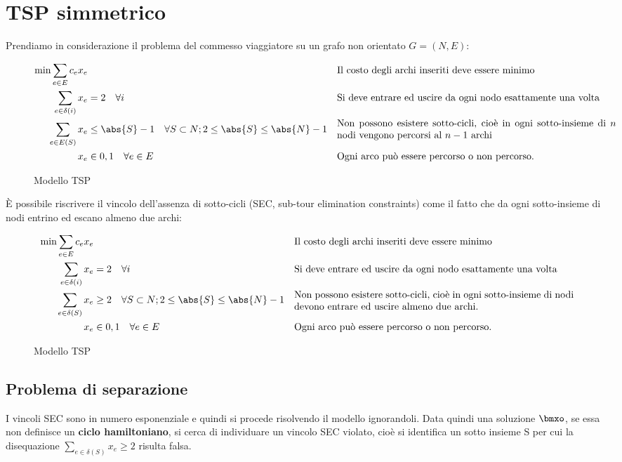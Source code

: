\documentclass[\main/main.tex]{subfiles}
\begin{document}
\chapter{TSP simmetrico}
Prendiamo in considerazione il problema del commesso viaggiatore su un grafo non orientato \(G=(N,E)\):
\begin{figure}
    \begin{align*}
        \min \sum_{e\in E} c_e x_e & &&\text{Il costo degli archi inseriti deve essere minimo}\\
        \sum_{e \in \delta(i)} x_e &= 2\quad \forall i &&\text{Si deve entrare ed uscire da ogni nodo esattamente una volta}\\
        \sum_{e \in E(S)} x_e & \leq \abs{S} - 1 \quad \forall S \subset N; 2 \leq \abs{S} \leq \abs{N} -1 && \parbox{10cm}{Non possono esistere sotto-cicli, cioè in ogni sotto-insieme di \(n\) nodi vengono percorsi al \(n-1\) archi}\\
        x_e & \in {0,1} \quad \forall e \in E && \text{Ogni arco può essere percorso o non percorso.}
    \end{align*}
    \caption{Modello TSP}
\end{figure}
È possibile riscrivere il vincolo dell'assenza di sotto-cicli (SEC, sub-tour elimination constraints) come il fatto che da ogni sotto-insieme di nodi entrino ed escano almeno due archi:
\begin{figure}
    \begin{align*}
        \min \sum_{e\in E} c_e x_e & &&\text{Il costo degli archi inseriti deve essere minimo}\\
        \sum_{e \in \delta(i)} x_e &= 2\quad \forall i &&\text{Si deve entrare ed uscire da ogni nodo esattamente una volta}\\
        \sum_{e \in \delta(S)} x_e &\geq 2 \quad \forall S \subset N; 2 \leq \abs{S} \leq \abs{N} -1 && \parbox{10cm}{Non possono esistere sotto-cicli, cioè in ogni sotto-insieme di nodi devono entrare ed uscire almeno due archi.}\\
        x_e & \in {0,1} \quad \forall e \in E && \text{Ogni arco può essere percorso o non percorso.}
    \end{align*}
    \caption{Modello TSP}
\end{figure}

\section{Problema di separazione}
I vincoli SEC sono in numero esponenziale e quindi si procede risolvendo il modello ignorandoli. Data quindi una soluzione \(\bmxo \), se essa non definisce un \textbf{ciclo hamiltoniano}, si cerca di individuare un vincolo SEC violato, cioè si identifica un sotto insieme S per cui la disequazione \(\sum_{e \in \delta(S)} x_e \geq 2\) risulta falsa.
\end{document}
